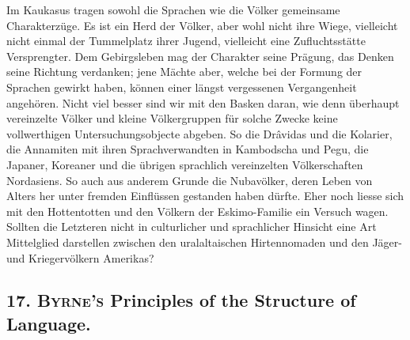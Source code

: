 Im Kaukasus tragen sowohl die Sprachen wie die Völker gemeinsame Charakterzüge. Es ist ein Herd der Völker, aber wohl nicht ihre Wiege, vielleicht nicht einmal der Tummelplatz ihrer Jugend, vielleicht  eine Zufluchtsstätte Versprengter. Dem Gebirgsleben mag der Charakter seine Prägung, das Denken seine Richtung verdanken; jene Mächte aber, welche bei der Formung der Sprachen gewirkt haben, können einer längst vergessenen Vergangenheit angehören. Nicht viel besser sind wir mit den Basken daran, wie denn überhaupt vereinzelte Völker und kleine Völkergruppen für solche Zwecke keine vollwerthigen Untersuchungsobjecte abgeben. So die Drâvidas und die Kolarier, die Annamiten mit ihren Sprachverwandten in Kambodscha und Pegu, die Japaner, Koreaner und die übrigen sprachlich vereinzelten Völkerschaften Nordasiens. So auch aus anderem Grunde die Nubavölker, deren Leben von Alters her unter fremden Einflüssen gestanden haben dürfte. Eher noch liesse sich mit den Hottentotten und den Völkern der Eskimo-Familie ein Versuch wagen. Sollten die Letzteren nicht in culturlicher und sprachlicher Hinsicht eine Art Mittelglied darstellen zwischen den \label{fp.405} uralaltaischen Hirtennomaden und den Jäger- und Kriegervölkern Amerikas?

\subsection*{17. \textsc{Byrne’s} Principles of the Structure of Language.}\label{IV.IV.17}

